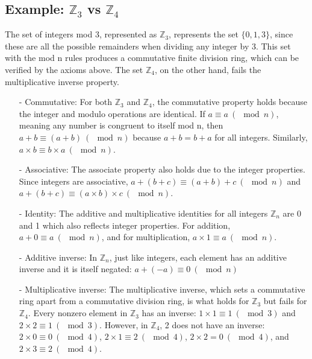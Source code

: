 \documentclass{article}
\begin{document}
\subsection{Example: $\mathbb{Z}_3$ vs $\mathbb{Z}_4$}
The set of integers mod 3, represented as $\mathbb{Z}_3$, represents the set $\{0, 1, 3\}$, since these are all the possible remainders when dividing any integer by 3. This set with the mod n rules produces a commutative finite division ring, which can be verified by the axioms above. The set $\mathbb{Z}_4$, on the other hand, fails the multiplicative inverse property.
\begin{itemize}
    \item[-] Commutative: For both $\mathbb{Z}_3$ and $\mathbb{Z}_4$, the commutative property holds because the integer and modulo operations are identical. If $a \equiv a \ (\mod n)$, meaning any number is congruent to itself mod n, then $a + b \equiv (a + b) \ (\mod n)$ because $a + b = b + a$ for all integers. Similarly, $a \times b \equiv b \times a \ (\mod n)$.

    \item[-] Associative: The associate property also holds due to the integer properties. Since integers are associative, $a+(b+c) \equiv (a + b) + c \ (\mod n)$ and $a+(b+c) \equiv (a \times b) \times c \ (\mod n)$.

    \item[-] Identity: The additive and multiplicative identities for all integers $\mathbb{Z}_n$ are 0 and 1 which also reflects integer properties. For addition, $a + 0 \equiv a \ (\mod n)$, and for multiplication, $a \times 1 \equiv a \ (\mod n)$.

    \item[-] Additive inverse: In $\mathbb{Z}_n$, just like integers, each element has an additive inverse and it is itself negated: $a + (-a) \equiv 0 \ (\mod n)$

    \item[-] Multiplicative inverse: The multiplicative inverse, which sets a commutative ring apart from a commutative division ring, is what holds for $\mathbb{Z}_3$ but fails for $\mathbb{Z}_4$. Every nonzero element in $\mathbb{Z}_3$ has an inverse: $1 \times 1 \equiv 1 \ (\mod 3)$ and $2 \times 2 \equiv 1 \ (\mod 3)$. However, in $\mathbb{Z}_4$, 2 does not have an inverse: $2 \times 0 \equiv 0 \ (\mod 4)$, $2 \times 1 \equiv 2 \ (\mod 4)$, $2 \times 2 = 0 \ (\mod 4)$, and  $2 \times 3 \equiv 2 \ (\mod 4)$.
\end{itemize}
\end{document}
